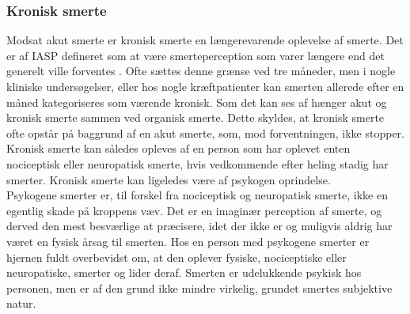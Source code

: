 \subsubsection{Kronisk smerte}
Modsat akut smerte er kronisk smerte en længerevarende oplevelse af smerte. Det er af IASP defineret som at være smerteperception som varer længere end det generelt ville forventes \citep{Carmon}. Ofte sættes denne grænse ved tre måneder, men i nogle kliniske undersøgelser, eller hos nogle kræftpatienter kan smerten allerede efter en måned kategoriseres som værende kronisk. Som det kan ses af  hænger akut og kronisk smerte sammen ved organisk smerte. Dette skyldes, at kronisk smerte ofte opstår på baggrund af en akut smerte, som, mod forventningen, ikke stopper. Kronisk smerte kan således opleves af en person som har oplevet enten nociceptisk eller neuropatisk smerte, hvis vedkommende efter heling stadig har smerter. Kronisk smerte kan ligeledes være af psykogen oprindelse.\\
Psykogene smerter er, til forskel fra nociceptisk og neuropatisk smerte, ikke en egentlig skade på kroppens væv. Det er en imaginær perception af smerte, og derved den mest besværlige at præcisere, idet der ikke er og muligvis aldrig har været en fysisk årsag til smerten. Hos en person med psykogene smerter er hjernen fuldt overbevidst om, at den oplever fysiske, nociceptiske eller neuropatiske, smerter og lider deraf. Smerten er udelukkende psykisk hos personen, men er af den grund ikke mindre virkelig, grundet smertes subjektive natur. \citep{Giangregorio1997}




